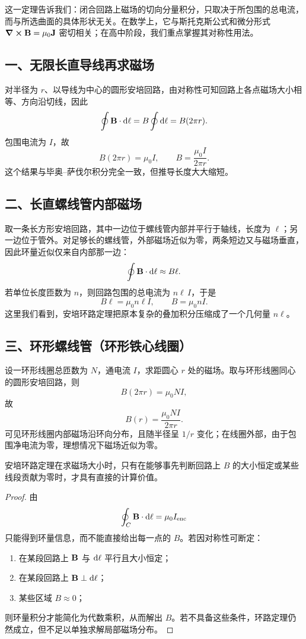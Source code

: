 这一定理告诉我们：闭合回路上磁场的切向分量积分，只取决于所包围的总电流，而与所选曲面的具体形状无关。在数学上，它与斯托克斯公式和微分形式 $\curl\vb{B}=\mu_0\vb{J}$ 密切相关；在高中阶段，我们重点掌握其对称性用法。

\subsection*{一、无限长直导线再求磁场}

对半径为 $r$、以导线为中心的圆形安培回路，由对称性可知回路上各点磁场大小相等、方向沿切线，因此
\[
  \oint \vb{B}\cdot\dd\vb{\ell}=B\oint \dd\ell=B(2\pi r).
\]
包围电流为 $I$，故
\[
  B(2\pi r)=\mu_0 I,
\qquad
  B=\frac{\mu_0 I}{2\pi r}.
\]
这个结果与毕奥--萨伐尔积分完全一致，但推导长度大大缩短。

\subsection*{二、长直螺线管内部磁场}

取一条长方形安培回路，其中一边位于螺线管内部并平行于轴线，长度为 $\ell$；另一边位于管外。对足够长的螺线管，外部磁场近似为零，两条短边又与磁场垂直，因此环量近似仅来自内部那一边：
\[
  \oint \vb{B}\cdot\dd\vb{\ell}\approx B\ell.
\]
若单位长度匝数为 $n$，则回路包围的总电流为 $n\ell\,I$，于是
\[
  B\ell=\mu_0 n\ell I,
  \qquad
  B=\mu_0 nI.
\]
这里我们看到，安培环路定理把原本复杂的叠加积分压缩成了一个几何量 $n\ell$。

\subsection*{三、环形螺线管（环形铁心线圈）}

设一环形线圈总匝数为 $N$，通电流 $I$，求距圆心 $r$ 处的磁场。取与环形线圈同心的圆形安培回路，则
\[
  B(2\pi r)=\mu_0 NI,
\]
故
\[
  B(r)=\frac{\mu_0 NI}{2\pi r}.
\]
可见环形线圈内部磁场沿环向分布，且随半径呈 $1/r$ 变化；在线圈外部，由于包围净电流为零，理想情况下磁场近似为零。

\begin{theorem}
安培环路定理在求磁场大小时，只有在能够事先判断回路上 $B$ 的大小恒定或某些线段贡献为零时，才具有直接的计算价值。
\end{theorem}

\begin{proof}
由
\[
  \oint_C \vb{B}\cdot\dd\vb{\ell}=\mu_0 I_{\mathrm{enc}}
\]
只能得到环量信息，而不能直接给出每一点的 $B$。若因对称性可断定：
\begin{enumerate}
  \item 在某段回路上 $\vb{B}$ 与 $\dd\vb{\ell}$ 平行且大小恒定；
  \item 在某段回路上 $\vb{B}\perp\dd\vb{\ell}$；
  \item 某些区域 $B\approx 0$；
\end{enumerate}
则环量积分才能简化为代数乘积，从而解出 $B$。若不具备这些条件，环路定理仍然成立，但不足以单独求解局部磁场分布。
\end{proof}

